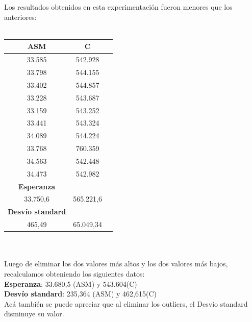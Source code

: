 Los resultados obtenidos en esta experimentaci\'on fueron menores que los anteriores: \\
\\       
        \begin{tabular}[c]{|c|c|c|}
	\hline
		\textbf{ASM} & \textbf{C}\\
		\hline
33.585 &	542.928 \\
\hline
33.798 &	544.155 \\
\hline
33.402 &	544.857 \\
\hline
33.228 &	543.687 \\
\hline
33.159 &	543.252 \\
\hline
33.441 &	543.324 \\
\hline
34.089 &	544.224 \\ 
\hline
33.768 &	760.359 \\ 
\hline
34.563 &	542.448 \\
\hline
34.473 &	542.982 \\
\hline
		\textbf{Esperanza}	\\
		\hline
33.750,6 & 565.221,6	\\		
		\hline
		\textbf{Desvío standard}	\\
		\hline
465,49 & 65.049,34\\
		\hline
	\end{tabular}\\\\
	Luego de eliminar los dos valores m\'as altos y los dos valores m\'as bajos, recalculamos obteniendo los siguientes datos: \\
	\textbf{Esperanza}: 33.680,5 (ASM) y 543.604(C)\\
	\textbf{Desvío standard}:	235,364 (ASM) y 462,615(C)\\
	Ac\'a tambi\'en se puede apreciar que al eliminar los outliers, el Desvío standard disminuye su valor. \\
\newpage
